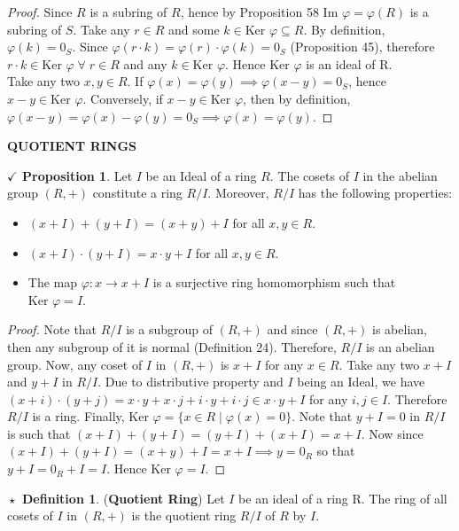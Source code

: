 \documentclass{article}
\theoremstyle{definition}
\newtheorem{definition}{$\boxed{\star}$ Definition}
\theoremstyle{remark}
\theoremstyle{definition}
\theoremstyle{definition}
\newtheorem{proposition}{$\checkmark$ Proposition}
\theoremstyle{definition}
\theoremstyle{proof}
\newcommand{\image}[0]{\text{Im }}
\newcommand{\kernel}[0]{\text{Ker }}
\begin{document}
\begin{proof}
	Since $ R $ is a subring of $ R $, hence by Proposition 58 $ \image\varphi = \varphi (R) $ is a subring of $ S $. Take any $ r\in R $ and some $ k \in \kernel\varphi \subseteq R $. By definition, $ \varphi(k) = 0_S $. Since $\varphi(r\cdot k) = \varphi(r) \cdot \varphi(k) = 0_S$ (Proposition 45), therefore $ r\cdot k \in \kernel\varphi \;\forall\;r\in R$ and any $ k\in \kernel\varphi $. Hence $ \kernel\varphi $ is an ideal of R.\\
	Take any two $ x, y\in R $. If $ \varphi(x) = \varphi(y) \implies \varphi(x-y) = 0_S $, hence $ x-y\in \kernel\varphi $. Conversely, if $x-y\in \kernel\varphi$, then by definition, $ \varphi(x-y) = \varphi(x)-\varphi(y) = 0_S \implies \varphi(x) = \varphi(y)$.
\end{proof}
\hrulefill
\textbf{QUOTIENT RINGS}
\hrulefill
\begin{proposition}
	Let $ I $ be an Ideal of a ring $ R $. The cosets of $ I $ in the abelian group $ (R,+) $ constitute a ring $ R/I $. Moreover, $ R/I $ has the following properties:
	\begin{itemize}
		\item{$ (x+I) + (y+I) = (x+y) + I $ for all $ x,y\in R $.}
		\item{$ (x+I)\cdot (y+I) = x\cdot y + I$ for all $ x,y\in R $.}
		\item{The map $ \varphi : x\longrightarrow x+I$ is a surjective ring homomorphism such that $ \kernel \varphi = I $.}
	\end{itemize}
\end{proposition}
\begin{proof}
	Note that $ R/I $ is a subgroup of $ (R,+) $ and since $ (R,+) $ is abelian, then any subgroup of it is normal (Definition 24). Therefore, $ R/I $ is an abelian group. Now, any coset of $ I $ in $ (R,+) $ is $ x + I $ for any $ x\in R $. Take any two $ x+I $ and $ y+I $ in $ R/I $. Due to distributive property and $ I $ being an Ideal, we have $ (x+i)\cdot (y+j) = x\cdot y + x\cdot j  + i\cdot y + i\cdot j \in x\cdot y + I$ for any $ i,j\in I $. Therefore $ R/I $ is a ring. Finally, $ \kernel \varphi = \{x\in R\;\vert\; \varphi(x) = 0\} $. Note that $y+I = 0 $ in $ R/I $ is such that $ (x+I) + (y+I) = (y+I) + (x+I) = x+I $. Now since $ (x+I)+(y+I) = (x+y) + I = x+I \implies y = 0_R$ so that $ y+ I = 0_R + I = I $. Hence $ \kernel\varphi = I $. 
\end{proof}
\hrulefill
\newpage
\begin{definition}
	(\textbf{Quotient Ring}) Let $ I $ be an ideal of a ring R. The ring of all cosets of $ I $ in $ (R,+) $ is the quotient ring $ R/I $ of $ R $ by $ I $. 
\end{definition}
\end{document}
